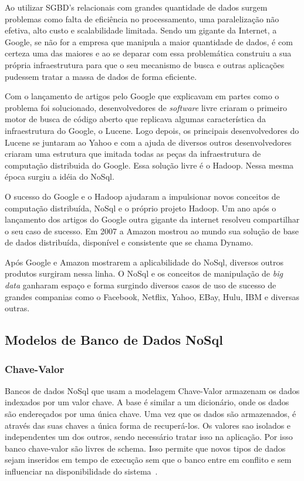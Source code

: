 Ao utilizar SGBD's relacionais com grandes quantidade de dados surgem problemas como falta de eficiência no processamento, uma paralelização não efetiva, alto custo e scalabilidade limitada. Sendo um gigante da Internet, a Google,  se não for a empresa que manipula a maior quantidade de dados, é com certeza uma das maiores e ao se deparar com essa problemática  construiu a sua própria infraestrutura para que o seu mecanismo de busca e outras aplicações pudessem tratar a massa de dados de forma eficiente.

Com o lançamento de artigos pelo Google que explicavam em partes como o problema foi solucionado, desenvolvedores de \textit{software} livre criaram o primeiro motor de busca de código aberto que replicava algumas característica da infraestrutura do Google, o Lucene. Logo depois, os principais desenvolvedores do Lucene se juntaram ao Yahoo e com a ajuda de diversos outros desenvolvedores criaram uma estrutura que imitada todas as peças da infraestrutura de computação distribuida do 
Google. Essa solução livre é o Hadoop. Nessa mesma época surgiu a idéia do NoSql. 

O sucesso do Google e o Hadoop ajudaram a impulsionar novos conceitos de computação distribuída, NoSql e o próprio projeto Hadoop. Um ano após o lançamento dos artigos do Google outra gigante da internet resolveu compartilhar o seu caso de sucesso. Em 2007 a Amazon mostrou ao mundo sua solução de base de dados distribuída, disponível e consistente que se chama Dynamo.

Após Google e Amazon mostrarem a aplicabilidade do NoSql, diversos
outros produtos surgiram nessa linha. O NoSql e os conceitos de manipulação de \textit{big data} ganharam espaço e forma surgindo diversos casos de uso de sucesso de grandes companias como o Facebook, Netflix, Yahoo, EBay, Hulu, IBM e diversas outras.


\subsection{Modelos de Banco de Dados NoSql}


\subsubsection{Chave-Valor}

Bancos de dados NoSql que usam a modelagem Chave-Valor armazenam os dados indexados por um valor chave. A base é similar a um dicionário, onde os dados são endereçados por uma única chave. Uma vez que os dados são armazenados, é através das suas chaves a única forma de recuperá-los. Os valores sao isolados e independentes um dos outros, sendo necessário tratar isso na aplicação. Por isso banco chave-valor são livres de schema. Isso permite que novos tipos de dados sejam inseridos em tempo de execução sem que o banco entre em conflito e sem influenciar na disponibilidade do sistema~\cite{nosqlevaluation,nosqlliveup}.

